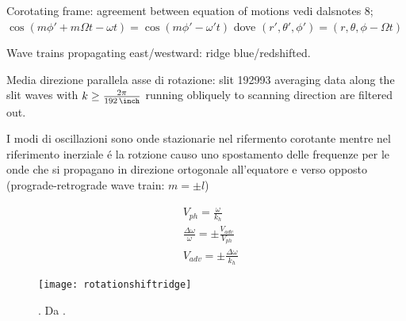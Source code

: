 \documentclass[../main.tex]{subfiles}
\begin{document}
\begin{workout}

Corotating frame: agreement between equation of motions vedi dalsnotes 8; $\cos{(m\phi'+m\Omega t-\omega t)}=\cos{(m\phi'-\omega't)}$ dove $(r',\theta',\phi')=(r,\theta,\phi-\Omega t)$

Wave trains propagating east/westward: ridge blue/redshifted.

\end{workout}

\begin{workout}

Media direzione parallela asse di rotazione: slit \SI{192}{\inch}\SI{993}{\inch} averaging data along the slit waves with $k\geq\frac{2\pi}{\SI{192}{\inch}}$ running obliquely to scanning direction are filtered out.

I modi di oscillazioni sono onde stazionarie nel rifermento corotante mentre nel riferimento inerziale \'e la rotzione causo uno spostamento delle frequenze per le onde che si propagano in direzione ortogonale all'equatore e verso opposto (prograde-retrograde wave train: $m=\pm l$)

\begin{align}
&V_{ph}=\frac{\omega}{k_h}\\
&\frac{\Delta\omega}{\omega}=\pm\frac{V_{adv}}{V_{ph}}\\
&V_{adv}=\pm\frac{\Delta\omega}{k_h}
\end{align}

\begin{wrapfigure}[23]{r}{0.5\textwidth}
\centering
\texttt{[image: rotationshiftridge]}
\caption{. Da \cite{rhodes1979new}.}\label{fig:rotationshiftridge}
\end{wrapfigure}

\end{workout}
\end{document}
